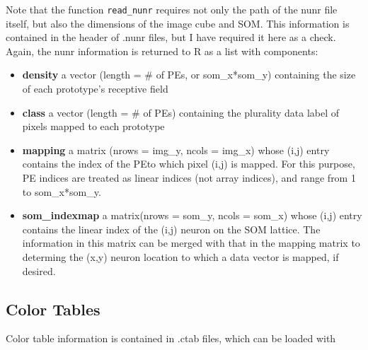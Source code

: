 \documentclass[]{article}
\newenvironment{Shaded}{\begin{snugshade}}{\end{snugshade}}
\newcommand{\CommentTok}[1]{\textcolor[rgb]{0.56,0.35,0.01}{\textit{#1}}}
\newcommand{\DataTypeTok}[1]{\textcolor[rgb]{0.13,0.29,0.53}{#1}}
\newcommand{\KeywordTok}[1]{\textcolor[rgb]{0.13,0.29,0.53}{\textbf{#1}}}
\newcommand{\NormalTok}[1]{#1}
\newcommand{\OperatorTok}[1]{\textcolor[rgb]{0.81,0.36,0.00}{\textbf{#1}}}
\newcommand{\StringTok}[1]{\textcolor[rgb]{0.31,0.60,0.02}{#1}}
\providecommand{\tightlist}{%
  \setlength{\itemsep}{0pt}\setlength{\parskip}{0pt}}
\begin{document}
Note that the function \texttt{read\_nunr} requires not only the path of the nunr file itself, but also the dimensions of the image cube and SOM. This information is contained in the header of .nunr files, but I have required it here as a check. Again, the nunr information is returned to R as a list with components:

\begin{itemize}
\tightlist
\item
  \textbf{density} a vector (length = \# of PEs, or som\_x*som\_y) containing the size of each prototype's receptive field
\item
  \textbf{class} a vector (length = \# of PEs) containing the plurality data label of pixels mapped to each prototype
\item
  \textbf{mapping} a matrix (nrows = img\_y, ncols = img\_x) whose (i,j) entry contains the index of the PEto which pixel (i,j) is mapped. For this purpose, PE indices are treated as linear indices (not array indices), and range from 1 to som\_x*som\_y.\\
\item
  \textbf{som\_indexmap} a matrix(nrows = som\_y, ncols = som\_x) whose (i,j) entry contains the linear index of the (i,j) neuron on the SOM lattice. The information in this matrix can be merged with that in the mapping matrix to determing the (x,y) neuron location to which a data vector is mapped, if desired.
\end{itemize}

\hypertarget{color-tables}{%
\subsection{Color Tables}\label{color-tables}}

Color table information is contained in .ctab files, which can be loaded with

\begin{Shaded}
\end{Shaded}
\end{document}

